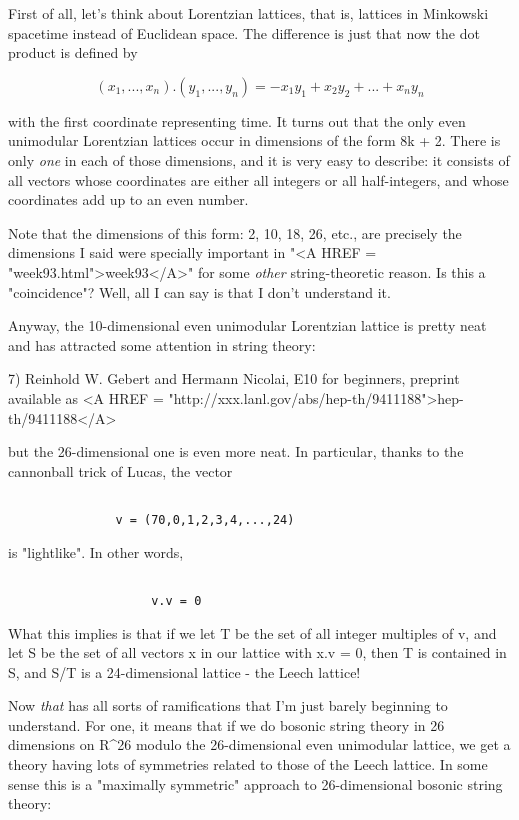 First of all, let's think about Lorentzian lattices, that is,
lattices in Minkowski spacetime instead of Euclidean space.  
The difference is just that now the dot product is defined by


$$

(x_{1},...,x_{n}) . (y_{1},...,y_{n}) = - x_{1} y_{1} + x_{2} y_{2} + ... + x_{n} y_{n}
$$
    
with the first coordinate representing time.  It turns out that
the only even unimodular Lorentzian lattices occur in dimensions
of the form 8k + 2.  There is only \emph{one} in each of those dimensions,
and it is very easy to describe: it consists of all vectors whose
coordinates are either all integers or all half-integers, and whose
coordinates add up to an even number.  

Note that the dimensions of this form: 2, 10, 18, 26, etc., are 
precisely the dimensions I said were specially important in "<A HREF = "week93.html">week93</A>" 
for some \emph{other} string-theoretic reason.  Is this a "coincidence"?
Well, all I can say is that I don't understand it.

Anyway, the 10-dimensional even unimodular Lorentzian lattice
is pretty neat and has attracted some attention in string theory:

7) Reinhold W. Gebert and Hermann Nicolai, E10 for beginners,
preprint available as <A HREF = "http://xxx.lanl.gov/abs/hep-th/9411188">hep-th/9411188</A> 

but the 26-dimensional one is even more neat.  In particular,
thanks to the cannonball trick of Lucas, the vector


\begin{verbatim}

               v = (70,0,1,2,3,4,...,24)
\end{verbatim}
    
is "lightlike".  In other words, 


\begin{verbatim}

                    v.v = 0 
\end{verbatim}
    
What this implies is that if we let T be the set of all integer
multiples of v, and let S be the set of all vectors x in our lattice
with x.v = 0, then T is contained in S, and S/T is a 24-dimensional
lattice - the Leech lattice!

Now \emph{that} has all sorts of ramifications that I'm just barely 
beginning to understand.   For one, it means that if we do bosonic 
string theory in 26 dimensions on R^{26} modulo the 26-dimensional even 
unimodular lattice, we get a theory having lots of symmetries related 
to those of the Leech lattice.  In some sense this is a "maximally 
symmetric" approach to 26-dimensional bosonic string theory:

